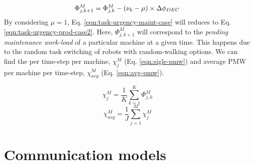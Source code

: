 \documentclass[journal]{IEEEtran}
\begin{document}
\begin{equation}
\begin{small}
\Phi_{j, k+1}^{M} = \Phi_{j, k}^{M}- (\nu_{k} - \mu) \times \Delta \phi_{DEC}
\label{eqn:task-urgency-maint-case}
\end{small}
\end{equation}
By considering $\mu = 1$, Eq. \ref{eqn:task-urgency-maint-case} will reduces to Eq. \ref{eqn:task-urgency-prod-case2}. Here, $\Phi_{j, k+1}^{M}$ will correspond to the {\em pending maintenance work-load} of a particular machine at a given time. This happens due to the random task switching of robots with random-walking options. %
We can find the  per time-step per machine, $\chi_{j}^{M}$ (Eq. \ref{eqn:sigle-pmw}) and average PMW per machine per time-step, $\chi_{avg}^{M}$ (Eq. \ref{eqn:avg-pmw}).
\begin{multicols}{2}
\vspace*{-1.65cm}
\begin{small}
\begin{equation}
\chi_{j}^{M}= \frac{1}{K} \sum_{k=1}^{K} \Phi_{j, k}^{M}
\label{eqn:sigle-pmw}
\end{equation}
\begin{equation}
\chi_{avg}^{M}= \frac{1}{J} \sum_{j=1}^{M} {\chi_{j}^{M}}
\label{eqn:avg-pmw}
\end{equation}
\end{small}
\end{multicols}
\section{Communication models}
\label{sec:comm-model}
\end{document}
